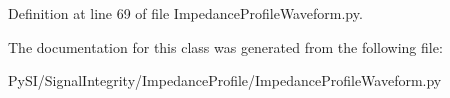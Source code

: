 Definition at line 69 of file Impedance\+Profile\+Waveform.\+py.



The documentation for this class was generated from the following file\+:\begin{DoxyCompactItemize}
\item 
Py\+S\+I/\+Signal\+Integrity/\+Impedance\+Profile/Impedance\+Profile\+Waveform.\+py\end{DoxyCompactItemize}
